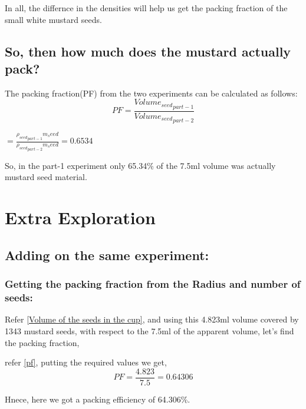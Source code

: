 \documentclass[twocolumn,11pt]{article}
\newcommand{\beq}{\begin{equation}}
\newcommand{\eeq}{\end{equation}}
\begin{document}
In all, the differnce in the densities will help us get the packing fraction of the small white mustard seeds.
\subsection{So, then how much does the mustard actually pack?}

The packing fraction(PF) from the two experiments can be calculated as follows:
\begin{equation}
\label{pf}
    PF = \frac{{Volume_{seed}}_{part-1}}{{Volume_{seed}}_{part-2}} 
\end{equation}

$=\frac{{\rho_{seed}}_{part-1} m_seed}{{\rho_{seed}}_{part-2}m_seed} = 0.6534$

So, in the part-1 experiment only 65.34\% of the 7.5ml volume was actually mustard seed material.

\section{Extra Exploration}
\subsection{Adding on the same experiment:}
\subsubsection{Getting the packing fraction from the Radius and number of seeds:}

Refer \eqref{Volume of the seeds in the cup}, and using this 4.823ml volume covered by 1343 mustard seeds, with respect to the 7.5ml of the apparent volume, let's find the packing fraction,

refer \eqref{pf}, 
putting the required values we get,
$$PF = \frac{4.823}{7.5} = 0.64306$$

Hnece, here we got a packing efficiency of 64.306\%.

\end{document}
